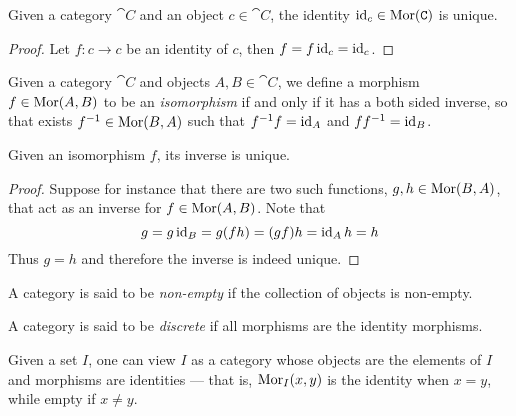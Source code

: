 \begin{corollary}\label{cor: unique identity}
Given a category \(\cat C\) and an object \(c \in \cat C\), the identity \(\operatorname{id}_c
\in \operatorname{Mor}(\texttt C)\) is unique.
\end{corollary}

\begin{proof}
Let \(f: c \to c\) be an identity of \(c\), then \(f = f \operatorname{id}_c = \operatorname{id}_c\).
\end{proof}

\begin{definition}[Isomorphism]\label{def:isomorphism}
Given a category \(\cat{C}\) and objects \(A, B \in \cat{C}\), we define a
morphism \(f \in \operatorname{Mor}(A, B)\) to be an \emph{isomorphism} if and only if it has
a both sided inverse, so that exists \(f^{-1} \in \operatorname{Mor}(B, A)\) such that
\(f^{-1}f = \operatorname{id}_A\) and \(ff^{-1} = \operatorname{id}_B\).
\end{definition}

\begin{proposition}\label{prop: iso unique inverse}
Given an isomorphism \(f\), its inverse is unique.
\end{proposition}

\begin{proof}
Suppose for instance that there are two such functions, \(g, h \in \operatorname{Mor}(B, A)\),
that act as an inverse for \(f \in \operatorname{Mor}(A, B)\). Note that
\[
  g = g \operatorname{id}_B = g(f h) = (g f) h = \operatorname{id}_A h = h
\]
Thus \(g = h\) and therefore the inverse is indeed unique.
\end{proof}

\begin{definition}
\label{def:non-empty-category}
A category is said to be \emph{non-empty} if the collection of objects is
non-empty.
\end{definition}

\begin{definition}
\label{def:discrete-category}
A category is said to be \emph{discrete} if all morphisms are the identity
morphisms.
\end{definition}

\begin{example}
\label{exp:index-category}
Given a set \(I\), one can view \(I\) as a category whose objects are the
elements of \(I\) and morphisms are identities --- that is, \(\operatorname{Mor}_I(x, y)\) is
the identity when \(x = y\), while empty if \(x \neq y\).
\end{example}

